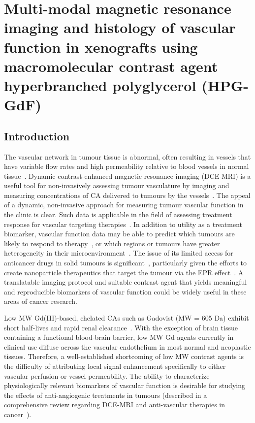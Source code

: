 
\chapter[MRI and histology of vascular function in xenografts using \acs{HPG-GdF}]{Multi-modal magnetic resonance imaging and histology of vascular function in xenografts using macromolecular contrast agent hyperbranched polyglycerol (HPG-GdF)}
\label{ch:HPG}

\section{Introduction}
The vascular network in tumour tissue is abnormal, often resulting in vessels that have variable flow rates and high permeability relative to blood vessels in normal tissue~\cite{McDonald:2002ut}.
Dynamic contrast-enhanced magnetic resonance imaging (DCE-MRI) is a useful tool for non-invasively assessing tumour vasculature by imaging and measuring concentrations of \acs{CA} delivered to tumours by the vessels~\cite{OConnor:2012ie,Barrett:2006jx,Leach:2003fy}.
The appeal of a dynamic, non-invasive approach for measuring tumour vascular function in the clinic is clear.
Such data is applicable in the field of assessing treatment response for vascular targeting therapies~\cite{OConnor:2012ie,Barrett:2006jx,Leach:2003fy}.
In addition to utility as a treatment biomarker, vascular function data may be able to predict which tumours are likely to respond to therapy~\cite{DeBruyne:2012cq,Kelly:2011cf,Bains:2009hh}, or which regions or tumours have greater heterogeneity in their microenvironment~\cite{OConnor:2011jm,Alic:2011hw}.
The issue of its limited access for anticancer drugs in solid tumours is significant~\cite{Minchinton:2006gs}, particularly given the efforts to create nanoparticle therapeutics that target the tumour via the \acs{EPR} effect~\cite{Jain:2001uf,Iyer:2006gf,Chauhan:2011fi}.
A translatable imaging protocol and suitable contrast agent that yields meaningful and reproducible biomarkers of vascular function could be widely useful in these areas of cancer research.

Low \acs{MW} Gd(III)-based, chelated \acs{CA}s such as Gadovist (\acs{MW} = 605 \acs{Da}) exhibit short half-lives and rapid renal clearance~\cite{Weinmann:1984gv}.
With the exception of brain tissue containing a functional blood-brain barrier, low \acs{MW} Gd agents currently in clinical use diffuse across the vascular endothelium in most normal and neoplastic tissues.
Therefore, a well-established shortcoming of low \acs{MW} contrast agents is the difficulty of attributing local signal enhancement specifically to either vascular perfusion or vessel permeability.
The ability to characterize physiologically relevant biomarkers of vascular function is desirable for studying the effects of anti-angiogenic treatments in tumours (described in a comprehensive review regarding DCE-MRI and anti-vascular therapies in cancer~\cite{OConnor:2012ie}).

